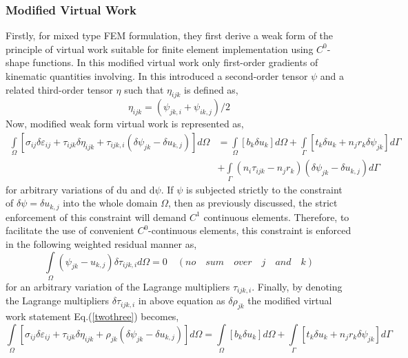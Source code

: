 \documentclass[12pt]{article}
\begin{document}
\subsubsection{ Modified Virtual Work}
Firstly, for mixed type FEM formulation, they first derive a weak form of the principle of virtual
work suitable for finite element implementation using $C^0$-shape functions. In this modified virtual work only first-order gradients of kinematic quantities involving. In this introduced a second-order tensor $\psi$ and a related third-order tensor $\eta$ such that $\eta_{ijk}$ is defined as,
\\
\begin{equation}\label{twotwo} 
\eta_{ijk} = (\psi_{jk,i}+\psi_{ik,j})/2
\end{equation}
Now, modified weak form virtual work is represented as,
\begin{equation}\label{twothree}
\begin{aligned}
\int\limits_\Omega\! [ \sigma_{ij}\delta\varepsilon_{ij} + \tau_{ijk}\delta\eta_{ijk} + \tau_{ijk,i}(\delta\psi_{jk}-\delta u_{k,j})  ] d\Omega &= \int\limits_\Omega\! [b_k\delta u_k] d\Omega + \int\limits_\Gamma\! [ t_k\delta u_k + n_jr_k\delta\psi_{jk} ] d\Gamma \\
&+ \int\limits_\Gamma\! ( n_i\tau_{ijk} -n_jr_k ) ( \delta\psi_{jk}-\delta u_{k,j} ) d\Gamma
\end{aligned}
\end{equation}
\newline
for arbitrary variations of du and d$\psi$. If $ \psi $ is subjected strictly to the constraint of
$ \delta\psi = \delta u_{k,j} $ into the whole domain $ \Omega $, then as previously discussed, the strict enforcement of this constraint will demand $C^1$ continuous elements. Therefore, to facilitate the use of convenient $C^0$-continuous elements, this constraint is enforced in the following weighted residual manner as,
\begin{equation}\label{twofour}
\int\limits_\Omega\! (\psi_{jk} - u_{k,j})\delta\tau_{ijk,i} d\Omega = 0  \quad (no \quad sum\quad over \quad j \quad and \quad k)
\end{equation}
for an arbitrary variation of the Lagrange multipliers $ \tau_{ijk,i} $. Finally, by denoting the Lagrange multipliers $ \delta \tau_{ijk,i}$ in above equation as $ \delta\rho_{jk} $ the modified virtual work statement Eq.(\ref{twothree}) becomes,
\begin{equation}
\int\limits_\Omega\! [ \sigma_{ij}\delta\varepsilon_{ij} + \tau_{ijk}\delta\eta_{ijk} + \rho_{jk}(\delta\psi_{jk}-\delta u_{k,j})] d\Omega = \int\limits_\Omega\! [b_k\delta u_k] d\Omega + \int\limits_\Gamma\! [ t_k\delta u_k + n_jr_k\delta\psi_{jk} ] d\Gamma
\end{equation}
\end{document}
